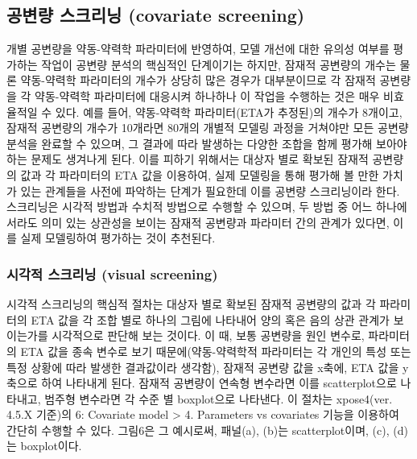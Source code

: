 \documentclass[
  10pt,
]{krantz}
\begin{document}
\hypertarget{uxacf5uxbcc0uxb7c9-uxc2a4uxd06cuxb9acuxb2dd-covariate-screening}{%
\subsection{공변량 스크리닝 (covariate screening)}\label{uxacf5uxbcc0uxb7c9-uxc2a4uxd06cuxb9acuxb2dd-covariate-screening}}

개별 공변량을 약동-약력학 파라미터에 반영하여, 모델 개선에 대한 유의성 여부를 평가하는 작업이 공변량 분석의 핵심적인 단계이기는
하지만, 잠재적 공변량의 개수는 물론 약동-약력학 파라미터의 개수가 상당히 많은 경우가 대부분이므로 각 잠재적 공변량을 각
약동-약력학 파라미터에 대응시켜 하나하나 이 작업을 수행하는 것은 매우 비효율적일 수 있다. 예를 들어, 약동-약력학
파라미터(ETA가 추정된)의 개수가 8개이고, 잠재적 공변량의 개수가 10개라면 80개의 개별적 모델링 과정을 거쳐야만 모든
공변량 분석을 완료할 수 있으며, 그 결과에 따라 발생하는 다양한 조합을 함께 평가해 보아야 하는 문제도 생겨나게 된다. 이를
피하기 위해서는 대상자 별로 확보된 잠재적 공변량의 값과 각 파라미터의 ETA 값을 이용하여, 실제 모델링을 통해 평가해 볼 만한
가치가 있는 관계들을 사전에 파악하는 단계가 필요한데 이를 공변량 스크리닝이라 한다. 스크리닝은 시각적 방법과 수치적 방법으로
수행할 수 있으며, 두 방법 중 어느 하나에서라도 의미 있는 상관성을 보이는 잠재적 공변량과 파라미터 간의 관계가 있다면,
이를 실제 모델링하여 평가하는 것이 추천된다.

\hypertarget{uxc2dcuxac01uxc801-uxc2a4uxd06cuxb9acuxb2dd-visual-screening}{%
\subsubsection{시각적 스크리닝 (visual screening)}\label{uxc2dcuxac01uxc801-uxc2a4uxd06cuxb9acuxb2dd-visual-screening}}

시각적 스크리닝의 핵심적 절차는 대상자 별로 확보된 잠재적 공변량의 값과 각 파라미터의 ETA 값을 각 조합 별로 하나의 그림에
나타내어 양의 혹은 음의 상관 관계가 보이는가를 시각적으로 판단해 보는 것이다. 이 때, 보통 공변량을 원인 변수로,
파라미터의 ETA 값을 종속 변수로 보기 때문에(약동-약력학적 파라미터는 각 개인의 특성 또는 특정 상황에 따라
발생한 결과값이라 생각함), 잠재적 공변량 값을 x축에, ETA 값을 y축으로 하여 나타내게 된다. 잠재적 공변량이 연속형
변수라면 이를 scatterplot으로 나타내고, 범주형 변수라면 각 수준 별 boxplot으로 나타낸다. 이
절차는 xpose4(ver. 4.5.X 기준)의 6: Covariate model \textgreater{} 4. Parameters vs
covariates 기능을 이용하여 간단히 수행할 수 있다. 그림6은 그 예시로써, 패널(a), (b)는
scatterplot이며, (c), (d)는 boxplot이다.
\end{document}

